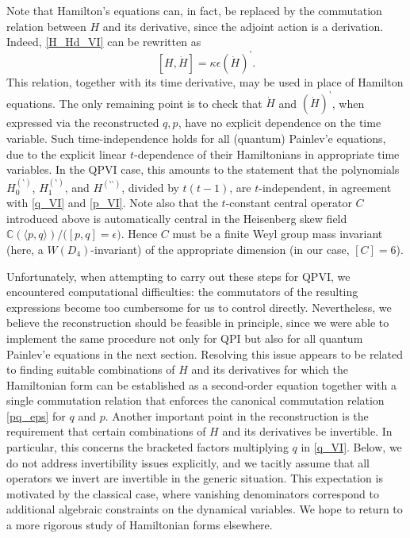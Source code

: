 \documentclass[12pt,a4paper]{article}
\numberwithin{equation}{section}
\begin{document}
Note that Hamilton’s equations can, in fact, be replaced by the commutation relation between $H$ and its derivative, since the adjoint action is a derivation. Indeed, \eqref{H_Hd_VI} can be rewritten as
\begin{equation}\label{H_Hd_Hameq}
[H,\dot{H}]=\kappa\epsilon (\dot{H})^\backprime.
\end{equation}
This relation, together with its time derivative, may be used in place of Hamilton equations. The only remaining point is to check that $\dot{H}$ and $(\dot{H})^\backprime$, when expressed via the reconstructed $q,p$, have no explicit dependence on the time variable. Such time-independence holds for all (quantum) Painlev'e equations, due to the explicit linear $t$-dependence of their Hamiltonians in appropriate time variables. In the QPVI case, this amounts to the statement that the polynomials $H_0^{(\backprime)}$, $H_1^{(\backprime)}$, and $H^{(\backprime\backprime)}$, divided by $t(t{-}1)$, are $t$-independent, in agreement with \eqref{q_VI} and \eqref{p_VI}. Note also that the $t$-constant central operator $C$ introduced above is automatically central in the Heisenberg skew field $\mathbb{C}(\langle p,q\rangle)/\big([p,q]=\epsilon\big)$. Hence $C$ must be a finite Weyl group mass invariant (here, a $W(D_4)$-invariant) of the appropriate dimension (in our case, $[C]=6$).  

Unfortunately, when attempting to carry out these steps for QPVI, we encountered computational difficulties: the commutators of the resulting expressions become too cumbersome for us to control directly. Nevertheless, we believe the reconstruction should be feasible in principle, since we were able to implement the same procedure not only for QPI but also for all quantum Painlev'e equations in the next section. Resolving this issue appears to be related to finding suitable combinations of $H$ and its derivatives for which the Hamiltonian form can be established as a second-order equation together with a single commutation relation that enforces the canonical commutation relation \eqref{pq_eps} for $q$ and $p$.
Another important point in the reconstruction is the requirement that certain combinations of $H$ and its derivatives be invertible. In particular, this concerns the bracketed factors multiplying $q$ in \eqref{q_VI}. Below, we do not address invertibility issues explicitly, and we tacitly assume that all operators we invert are invertible in the generic situation. This expectation is motivated by the classical case, where vanishing denominators correspond to additional algebraic constraints on the dynamical variables. We hope to return to a more rigorous study of Hamiltonian forms elsewhere.
\end{document}
